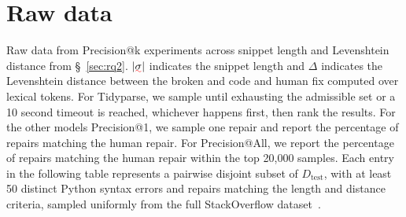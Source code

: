 \documentclass[sigplan,review,acmsmall,nonacm,screen,anonymous]{acmart}\settopmatter{printfolios=false,printccs=false,printacmref=false}
\begin{document}
\clearpage\section{Raw data}\label{sec:raw_prec_data}

Raw data from Precision@k experiments across snippet length and Levenshtein distance from \S~\ref{sec:rq2}. $|\err\sigma|$ indicates the snippet length and $\Delta$ indicates the Levenshtein distance between the broken and code and human fix computed over lexical tokens. For Tidyparse, we sample until exhausting the admissible set or a 10 second timeout is reached, whichever happens first, then rank the results. For the other models Precision@1, we sample one repair and report the percentage of repairs matching the human repair. For Precision@All, we report the percentage of repairs matching the human repair within the top 20,000 samples. Each entry in the following table represents a pairwise disjoint subset of $D_{\text{test}}$, with at least 50 distinct Python syntax errors and repairs matching the length and distance criteria, sampled uniformly from the full StackOverflow dataset~\cite{wong2019syntax}.
\end{document}
